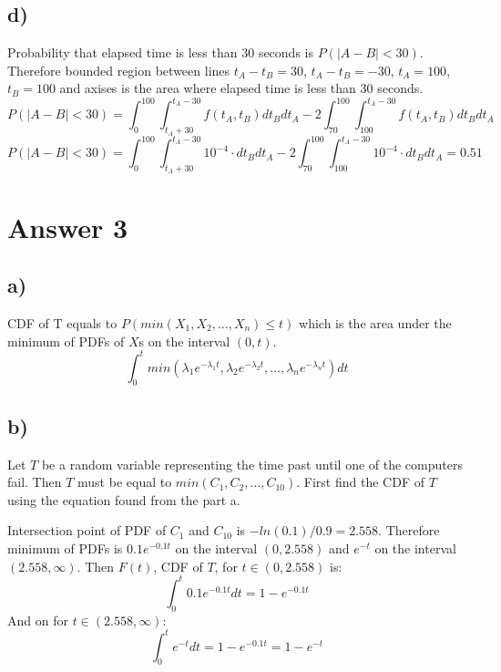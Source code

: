 \documentclass[12pt]{article}
\begin{document}
\subsection*{d)}
Probability that elapsed time is less than $30$ seconds is $P(|A-B|<30)$. Therefore bounded region between lines $t_A-t_B=30$, $t_A-t_B=-30$, $t_A=100$, $t_B = 100$ and axises is the area where elapsed time is less than $30$ seconds.
	\begin{equation*}
		P(|A-B|<30)=\int_{0}^{100} \int_{t_A+30}^{t_A-30} f(t_A, t_B) dt_Bdt_A - 2\int_{70}^{100} \int_{100}^{t_A-30} f(t_A, t_B) dt_Bdt_A
	\end{equation*}
	\begin{equation*}
		P(|A-B|<30)=\int_{0}^{100} \int_{t_A+30}^{t_A-30} 10^{-4}\cdot dt_Bdt_A - 2\int_{70}^{100} \int_{100}^{t_A-30} 10^{-4}\cdot dt_Bdt_A= 0.51
	\end{equation*}

\section*{Answer 3}
\subsection*{a)}
CDF of T equals to $P(min(X_1, X_2, \dots, X_n) \leq t)$ which is the area under the minimum of PDFs of $X$s on the interval $(0,t)$.
	\begin{equation*}
		 \int_{0}^{t}min(\lambda _1e^{-\lambda _1t}, \lambda _2e^{-\lambda _2t}, \dots, \lambda _ne^{-\lambda _nt})dt
	\end{equation*}
\subsection*{b)}
Let $T$ be a random variable representing the time past until one of the computers fail. Then $T$ must be equal to $min(C_1, C_2, \dots, C_{10})$. First find the CDF of $T$ using the equation found from the part a.

Intersection point of PDF of $C_1$ and $C_{10}$ is $-ln(0.1) / 0.9 = 2.558$. Therefore minimum of PDFs is $0.1e^{-0.1t}$ on the interval $(0, 2.558)$ and $e^{-t}$ on the interval $(2.558, \infty)$.
Then $F(t)$, CDF of $T$, for $t \in (0,2.558)$ is:
	\begin{equation*}
		\int_{0}^{t}0.1e^{-0.1t}dt = 1-e^{-0.1t}
	\end{equation*}
And on for $t\in(2.558, \infty)$:
	\begin{equation*}
		\int_{0}^{t}e^{-t}dt = 1-e^{-0.1t} = 1-e^{-t}
	\end{equation*}
\end{document}
